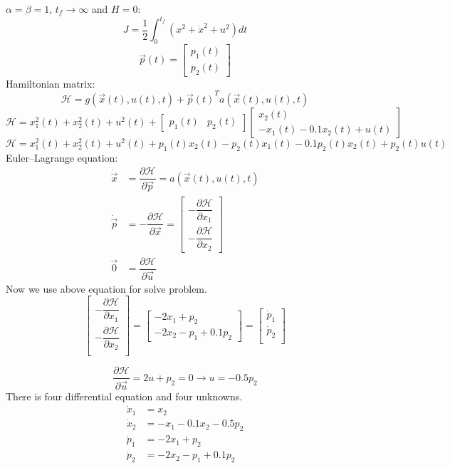 $\alpha = \beta = 1$, $t_f\to \infty $ and $H = 0$:
$$J = \dfrac 12 \int_0^{t_f} (x^2 + \dot x^2 + u^2)dt$$
$$\vec{p}(t) = \begin{bmatrix}
	p_1(t) \\
	p_2(t)
\end{bmatrix} $$
Hamiltonian matrix:
$$\mathcal{H} =  g(\vec x(t), u(t), t) + {\vec{p}(t)}^Ta(\vec x(t), u(t), t)$$
$$
\mathcal{H} = 
x_1^2(t) +  x_2^2(t) + u^2(t)  +
 \begin{bmatrix}
	p_1(t) & p_2(t)
\end{bmatrix}  \begin{bmatrix}
	x_2(t)\\
	-x_1(t)- 0.1x_2(t) + u(t) 
\end{bmatrix} 
$$
$$
\mathcal{H} = 
x_1^2(t) +  x_2^2(t) + u^2(t) + 
p_1(t)x_2(t) -p_2(t)x_1(t)- 0.1p_2(t)x_2(t)+p_2(t)u(t)
$$
Euler–Lagrange equation:
\begin{align}
\dot{\vec{x}} &= \dfrac{\partial \mathcal{H} }{\partial \vec{p}} = a(\vec x(t), u(t), t)\\
\dot{\vec{p}} &= -\dfrac{\partial \mathcal{H} }{\partial \vec{x}} =  \begin{bmatrix}
	-\dfrac{\partial \mathcal{H} }{\partial x_1}\\[10pt]
	-\dfrac{\partial \mathcal{H} }{\partial x_2}
\end{bmatrix} \\
\vec{0} &= \dfrac{\partial \mathcal{H} }{\partial \vec{u}}
\end{align}
Now we use above equation for solve problem.
$$
\begin{bmatrix}
	-\dfrac{\partial \mathcal{H} }{\partial x_1}\\[10pt]
	-\dfrac{\partial \mathcal{H} }{\partial x_2}\\
\end{bmatrix}  = 
\begin{bmatrix}
	-2x_1+p_2\\
	-2x_2-p_1 +0.1p_2
\end{bmatrix} 
= 
\begin{bmatrix}
	\dot p_1\\
	\dot p_2\\
\end{bmatrix} 
$$

$$
\dfrac{\partial \mathcal{H} }{\partial \vec{u}} = 2u+p_2 = 0 \to u = -0.5p_2
$$
There is four differential equation and four unknowns.
\begin{align}
\dot x_1 &= x_2\\
\dot x_2 &= -x_1- 0.1x_2 - 0.5p_2 \\
\dot p_1 &= -2x_1+p_2\\
\dot p_2 &= -2x_2-p_1 +0.1p_2
\end{align}

